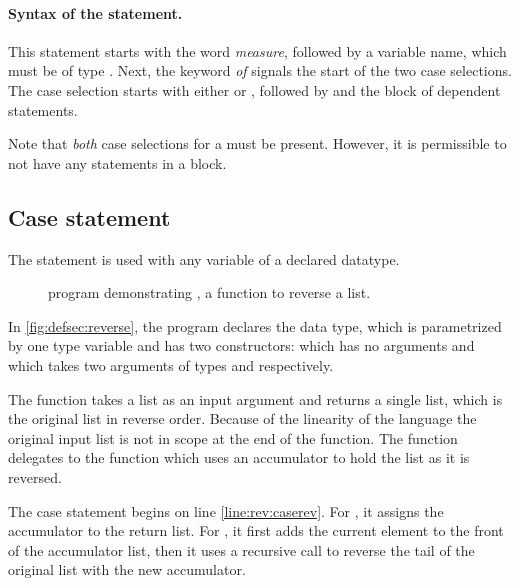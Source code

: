 \paragraph{Syntax of the  statement.} This statement
starts with the word \emph{measure}, 
followed by a variable name, which must be of type . 
Next, the keyword \emph{of} signals the start of the two case selections.
 The case selection starts with either  or , followed by
\inlqpl{=>} and the block of dependent statements.

Note that \emph{both} case selections for a \qubit{} must be present. However,
it is permissible to not have any statements in a block.

\subsection{Case statement}\label{subsec:casestatements}
The  statement is used with any variable of a declared
datatype. 
\begin{figure}[htbp]
\begin{singlespace}

\end{singlespace}
\caption[Reverse program to demonstrate ]{\lqpl{} program demonstrating , a function to reverse a list.}
\label{fig:defsec:reverse}
\end{figure}  


In \vref{fig:defsec:reverse}, the program declares the
  data type, which is parametrized by one
type variable and has two constructors:  which has no
arguments and  which takes two arguments of types
 and  respectively.

The function  takes a list 
as an input argument and returns a single list, which is the original 
list in reverse order. Because of the linearity of the language
the original input list is not in scope at the end of the function.
The function  delegates to the function 
which uses an accumulator to hold the list as it is reversed.

The case statement begins on line \ref{line:rev:caserev}. For
, it assigns the accumulator to the return list. For
, it first adds the current element to the
front of the accumulator list, then it uses a recursive call
to reverse the tail of the original list with the new accumulator.


